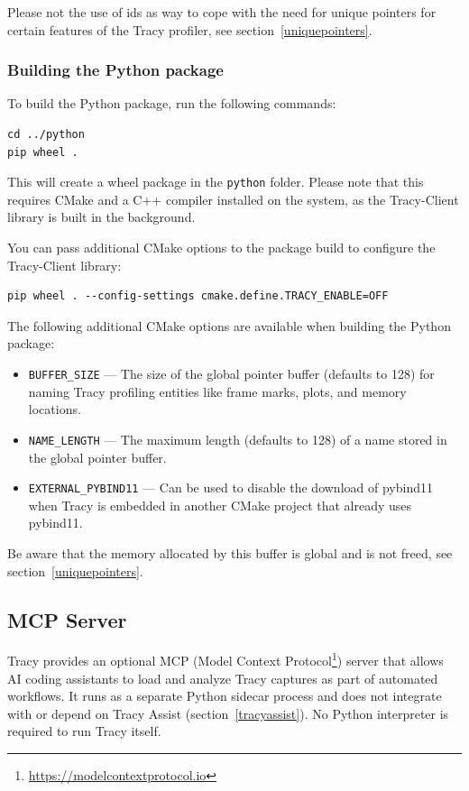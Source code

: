 \documentclass[hidelinks,titlepage,a4paper,twoside]{article}
\begin{document}
Please not the use of ids as way to cope with the need for unique pointers for certain features of the Tracy profiler, see section~\ref{uniquepointers}.

\subsubsection{Building the Python package}

To build the Python package, run the following commands:

\begin{lstlisting}
cd ../python
pip wheel .
\end{lstlisting}

This will create a wheel package in the \texttt{python} folder.
Please note that this requires CMake and a C++ compiler installed on the system, as the Tracy-Client library is built in the background.

You can pass additional CMake options to the package build to configure the Tracy-Client library:
\begin{lstlisting}
pip wheel . --config-settings cmake.define.TRACY_ENABLE=OFF
\end{lstlisting}

The following additional CMake options are available when building the Python package:

\begin{itemize}
\item \texttt{BUFFER\_SIZE} --- The size of the global pointer buffer (defaults to 128) for naming Tracy profiling entities like frame marks, plots, and memory locations.
\item \texttt{NAME\_LENGTH} --- The maximum length (defaults to 128) of a name stored in the global pointer buffer.
\item \texttt{EXTERNAL\_PYBIND11} --- Can be used to disable the download of pybind11 when Tracy is embedded in another CMake project that already uses pybind11.
\end{itemize}

Be aware that the memory allocated by this buffer is global and is not freed, see section~\ref{uniquepointers}.

\subsection{MCP Server}
\label{mcpserver}

Tracy provides an optional MCP (Model Context Protocol\footnote{\url{https://modelcontextprotocol.io}}) server that allows AI coding assistants to load and analyze Tracy captures as part of automated workflows. It runs as a separate Python sidecar process and does not integrate with or depend on Tracy Assist (section~\ref{tracyassist}). No Python interpreter is required to run Tracy itself.
\end{document}
